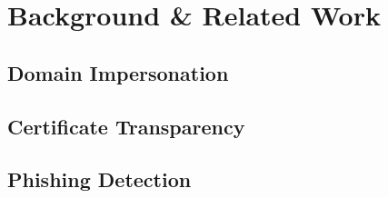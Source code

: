 \section{Background \& Related Work}
\label{sec:background}

\subsection{Domain Impersonation}


\subsection{Certificate Transparency}


\subsection{Phishing Detection}


